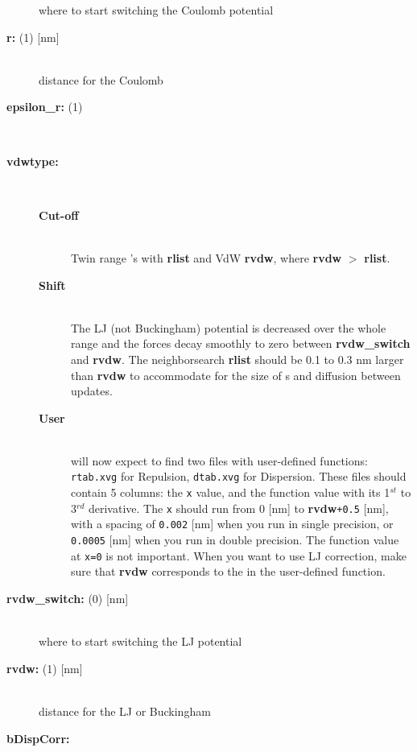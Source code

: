 \begin{description}
where to start switching the Coulomb potential
\item[{\bf r\normindex{coulomb}: }(1) {[nm]}]\mbox{}\\
distance for the Coulomb 
\item[{\bf epsilon\_r: }(1)]\mbox{}\\
\item[{\bf vdwtype:}]\mbox{}\\
\vspace{-2ex}\begin{description}
\item[{\bf Cut-off}]\mbox{}\\
Twin range 's with   {\bf rlist} and 
VdW  {\bf rvdw},
where {\bf rvdw} {\tt $>$} {\bf rlist}.
\item[{\bf Shift}]\mbox{}\\
The LJ (not Buckingham)
potential is decreased over the whole range and the forces decay smoothly
to zero between {\bf rvdw\_switch} and {\bf rvdw}.
The neighborsearch  {\bf rlist} should be 0.1 to 0.3 nm larger than
{\bf rvdw} to accommodate for the size of s and diffusion
between  updates.
\item[{\bf User}]\mbox{}\\
{\tt {}} will now expect to find two files with user-defined
functions: {\tt rtab.xvg} for Repulsion, {\tt dtab.xvg} for Dispersion.
These files should contain 5 columns:
the {\tt x} value, and the function value with its 1$^{st}$
to 3$^{rd}$ derivative. The {\tt x} should run from 0 [nm] to
{\bf rvdw}{\tt +0.5} [nm], with a spacing of {\tt 0.002}
[nm] when you run in single precision, or {\tt 0.0005} [nm] when
you run in double precision. The function value at {\tt x=0} is not
important. When you want to use LJ correction, make sure that {\bf rvdw}
corresponds to the  in the user-defined function.
\end{description}
\item[{\bf rvdw\_switch: }(0) {[nm]}]\mbox{}\\
where to start switching the LJ potential
\item[{\bf rvdw: }(1) {[nm]}]\mbox{}\\
distance for the LJ or Buckingham 
\item[{\bf bDispCorr:}]\mbox{}\\

\end{description}
